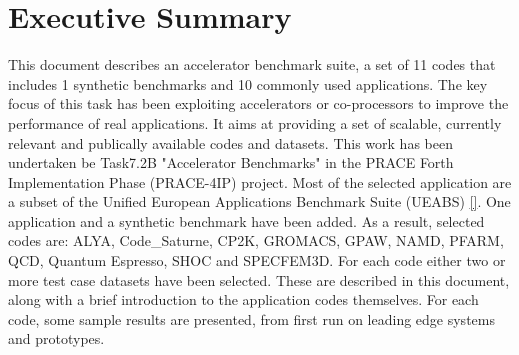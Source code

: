 \part*{Executive Summary}

This document describes an accelerator benchmark suite, a set of 11 codes that includes 1 synthetic benchmarks and 10 commonly used applications. The key focus of this task has been exploiting accelerators or co-processors to improve the performance of real applications. It aims at providing a set of scalable, currently relevant and publically available codes and datasets.
This work has been undertaken be Task7.2B "Accelerator Benchmarks" in the PRACE Forth Implementation Phase (PRACE-4IP) project.
Most of the selected application are a subset of the Unified European Applications Benchmark Suite (UEABS) \ref{}. One application and a synthetic benchmark have been added.
As a result, selected codes are: ALYA, Code_Saturne, CP2K, GROMACS, GPAW, NAMD, PFARM, QCD, Quantum Espresso, SHOC and SPECFEM3D.
For each code either two or more test case datasets have been selected. These are described in this document, along with a brief introduction to the application codes themselves. For each code, some sample results are presented, from first run on leading edge systems and prototypes.




